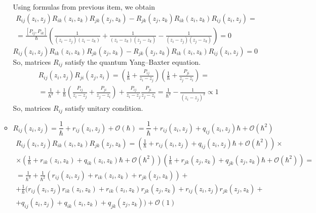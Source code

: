 \documentclass[12pt]{article}
\theoremstyle{definition}
\begin{document}
\begin{enumerate}
\begin{itemize}
        Using formulas from previous item, we obtain
        \begin{multline}
            R_{ij}(z_i,z_j)R_{ik}(z_i, z_k)R_{jk}(z_j, z_k)-R_{jk} (z_j, z_k )R_{ik}(z_i, z_k)R_{ij}(z_i, z_j)=\\=\frac{[P_{ij},P_{ik}]}{\hbar}\left(\frac{1}{(z_i-z_j)(z_i-z_k)}+\frac{1}{(z_i-z_k)(z_j-z_k)}-\frac{1}{(z_i-z_j)(z_j-z_k)}\right)=0
        \end{multline}
        \begin{equation}
            \boxed{R_{ij}(z_i,z_j)R_{ik}(z_i, z_k)R_{jk}(z_j, z_k)-R_{jk}(z_j, z_k)R_{ik}(z_i, z_k)R_{ij}(z_i, z_j)=0}
        \end{equation}
        So, matrices $R_{ij}$ satisfy the quantum Yang–Baxter equation.
        \begin{multline}
            R_{ij} (z_i, z_j )R_{ji}(z_j , z_i)=\left(\frac{1}{\hbar}+\frac{P_{ij}}{z_i-z_j}\right)\left(\frac{1}{\hbar}+\frac{P_{ji}}{z_j-z_i}\right)=\\=\frac{1}{\hbar^2}+\frac{1}{\hbar}\left(\frac{P_{ij}}{z_i-z_j}+\frac{P_{ji}}{z_j-z_i}\right)+ \frac{P_{ij}}{z_i-z_j}\frac{P_{ji}}{z_j-z_i}=\frac{1}{\hbar^2}-\frac{1}{(z_i-z_j)^2} \propto 1
        \end{multline}
        So, matrices $R_{ij}$ satisfy unitary condition.
        \item
        \begin{equation}
            R_{ij}(z_i,z_j)=\frac{1}{\hbar}+r_{ij}(z_i, z_j)+\mathcal{O}(\hbar)=\frac{1}{\hbar}+r_{ij}(z_i, z_j)+q_{ij}(z_i,z_j)\hbar+\mathcal{O}(\hbar^2)
        \end{equation}
        \begin{multline}
            R_{ij}(z_i,z_j)R_{ik}(z_i,z_k)R_{jk}(z_j,z_k)=\left(\frac{1}{\hbar}+r_{ij}(z_i, z_j)+q_{ij}(z_i,z_j)\hbar+\mathcal{O}(\hbar^2)\right)\times\\\times\left(\frac{1}{\hbar}+r_{ik}(z_i, z_k)+q_{ik}(z_i,z_k)\hbar+\mathcal{O}(\hbar^2)\right)\left(\frac{1}{\hbar}+r_{jk}(z_j,z_k)+q_{jk}(z_j,z_k)\hbar+\mathcal{O}(\hbar^2)\right)=\\=\frac{1}{\hbar^3}+\frac{1}{\hbar^2}(r_{ij}(z_i,z_j)+r_{ik}(z_i,z_k)+r_{jk}(z_j,z_k))+\\+\frac{1}{\hbar}(r_{ij}(z_i,z_j)r_{ik}(z_i,z_k)+r_{ik}(z_i,z_k)r_{jk}(z_j,z_k)+r_{ij}(z_i,z_j)r_{jk}(z_j,z_k)+\\+q_{ij}(z_i,z_j)+q_{ik}(z_i,z_k)+q_{jk}(z_j,z_k))+\mathcal{O}(1)
        \end{multline}
        \begin{multline}

\end{multline}
\end{itemize}
\end{enumerate}
\end{document}
